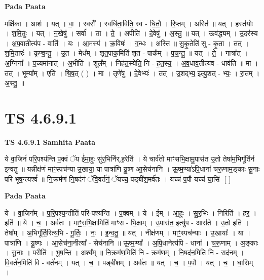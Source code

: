 \documentclass[17pt]{extarticle}
\begin{document}
\textbf{Pada Paata} \newline

मक्षि॑का । आश॑ । यत् । वा॒ । स्वरौ᳚ । स्वधि॑ता॒विति॒ स्व - धि॒तौ॒ । रि॒प्तम् । अस्ति॑ ॥ यत् । हस्त॑योः । श॒मि॒तुः । यत् । न॒खेषु॑ । सर्वा᳚ । ता । ते॒ । अपीति॑ । दे॒वेषु॑ । अ॒स्तु॒ ॥ यत् । ऊव॑द्ध्यम् । उ॒दर॑स्य । अ॒प॒वातीत्य॑प - वाति॑ । यः । आ॒मस्य॑ । क्र॒विषः॑ । ग॒न्धः । अस्ति॑ ॥ सु॒कृ॒तेति॑ सु - कृ॒ता । तत् । श॒मि॒तारः॑ । कृ॒ण्व॒न्तु॒ । उ॒त । मेध᳚म् । शृ॒त॒पाक॒मिति॑ शृत - पाक᳚म् । प॒च॒न्तु॒ ॥ यत् । ते॒ । गात्रा᳚त् । अ॒ग्निना᳚ । प॒च्यमा॑नात् । अ॒भीति॑ । शूल᳚म् । निह॑त॒स्येति॒ नि - ह॒त॒स्य॒ । अ॒व॒धाव॒तीत्य॑व - धाव॑ति ॥ मा । तत् । भूम्या᳚म् । एति॑ । श्रि॒ष॒त् ( ) । मा । तृणे॑षु । दे॒वेभ्यः॑ । तत् । उ॒शद्भ्य॒ इत्यु॒शत् - भ्यः॒ । रा॒तम् । अ॒स्तु॒ ॥  \newline




\section*{ TS 4.6.9.1 }

\textbf{TS 4.6.9.1 } \newline
\textbf{Samhita Paata} \newline

ये वा॒जिनं॑ परि॒पश्य॑न्ति प॒क्वं ॅय ई॑मा॒हुः सु॑र॒भिर्निर्.ह॒रेति॑ । ये चार्व॑तो माꣳसभि॒क्षामु॒पास॑त उ॒तो तेषा॑म॒भिगू᳚र्तिर्न इन्वतु ॥ यन्नीक्ष॑णं माꣳ॒॒स्पच॑न्या उ॒खाया॒ या पात्रा॑णि यू॒ष्ण आ॒सेच॑नानि । ऊ॒ष्म॒ण्या॑ऽपि॒धाना॑ चरू॒णाम॒ङ्काः सू॒नाः परि॑ भूष॒न्त्यश्वं᳚ ॥ नि॒क्रम॑णं नि॒षद॑नं ॅवि॒वर्त॑नं॒ ॅयच्च॒ पड्बी॑श॒मर्व॑तः । यच्च॑ प॒पौ यच्च॑ घा॒सिं -[  ] \newline

\textbf{Pada Paata} \newline

ये । वा॒जिन᳚म् । प॒रि॒पश्य॒न्तीति॑ परि-पश्य॑न्ति । प॒क्वम् । ये । ई॒म् । आ॒हुः । सु॒र॒भिः । निरिति॑ । ह॒र॒ । इति॑ ॥ ये । च॒ । अर्व॑तः । माꣳ॒॒स॒भि॒क्षामिति॑ माꣳस - भि॒क्षाम् । उ॒पास॑त॒ इत्यु॑प - आस॑ते । उ॒तो इति॑ । तेषा᳚म् । अ॒भिगू᳚र्ति॒रित्य॒भि - गू॒र्तिः॒ । नः॒ । इ॒न्व॒तु॒ ॥ यत् । नीक्ष॑णम् । माꣳ॒॒स्पच॑न्याः । उ॒खायाः᳚ । या । पात्रा॑णि । यू॒ष्णः । आ॒सेच॑ना॒नीत्या᳚ - सेच॑नानि ॥ ऊ॒ष्म॒ण्या᳚ । अ॒पि॒धानेत्य॑पि - धाना᳚ । च॒रू॒णाम् । अ॒ङ्काः । सू॒नाः । परीति॑ । भू॒ष॒न्ति॒ । अश्व᳚म् ॥ नि॒क्रम॑ण॒मिति॑ नि - क्रम॑णम् । नि॒षद॑न॒मिति॑ नि - सद॑नम् । वि॒वर्त॑न॒मिति॑ वि - वर्त॑नम् । यत् । च॒ । पड्बी॑शम् । अर्व॑तः ॥ यत् । च॒ । प॒पौ । यत् । च॒ । घा॒सिम् ।  \newline
\end{document}
